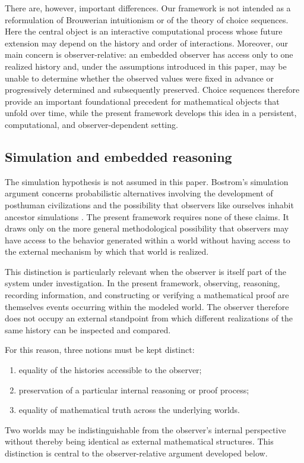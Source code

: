 \documentclass[11pt]{article}
\begin{document}
There are, however, important differences.  Our framework is not intended as a reformulation
of Brouwerian intuitionism or of the theory of choice sequences.  Here the central object is
an interactive computational process whose future extension may depend on the history and
order of interactions.  Moreover, our main concern is observer-relative: an embedded observer
has access only to one realized history and, under the assumptions introduced in this paper,
may be unable to determine whether the observed values were fixed in advance or progressively
determined and subsequently preserved.  Choice sequences therefore provide an important
foundational precedent for mathematical objects that unfold over time, while the present
framework develops this idea in a persistent, computational, and observer-dependent setting.

\subsection{Simulation and embedded reasoning}

The simulation hypothesis is not assumed in this paper.  Bostrom's simulation argument
concerns probabilistic alternatives involving the development of posthuman civilizations and
the possibility that observers like ourselves inhabit ancestor simulations
\cite{Bostrom2003}.  The present framework requires none of these claims.  It draws only on
the more general methodological possibility that observers may have access to the behavior
generated within a world without having access to the external mechanism by which that world
is realized.

This distinction is particularly relevant when the observer is itself part of the system
under investigation.  In the present framework, observing, reasoning, recording information,
and constructing or verifying a mathematical proof are themselves events occurring within the
modeled world.  The observer therefore does not occupy an external standpoint from which
different realizations of the same history can be inspected and compared.

For this reason, three notions must be kept distinct:
\begin{enumerate}[label=(\roman*)]
\item equality of the histories accessible to the observer;
\item preservation of a particular internal reasoning or proof process;
\item equality of mathematical truth across the underlying worlds.
\end{enumerate}
Two worlds may be indistinguishable from the observer's internal perspective without thereby
being identical as external mathematical structures.  This distinction is central to the
observer-relative argument developed below.
\end{document}
